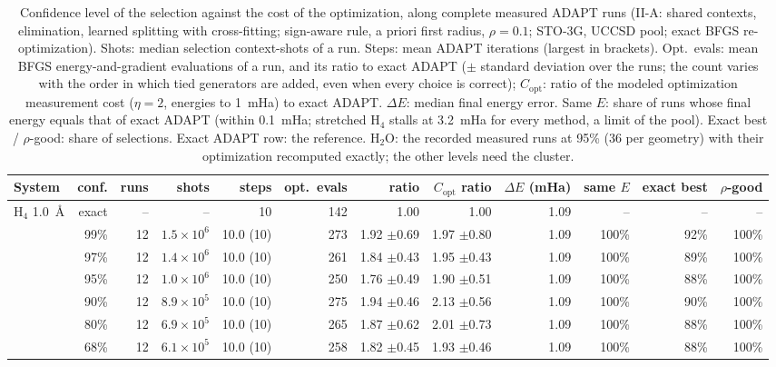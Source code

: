 \begin{table}[!htb]
\centering\small
\caption{Confidence level of the selection against the cost of the optimization, along complete measured ADAPT runs (II-A: shared contexts, elimination, learned splitting with cross-fitting; sign-aware rule, a priori first radius, $\rho=0.1$; STO-3G, UCCSD pool; exact BFGS re-optimization). Shots: median selection context-shots of a run. Steps: mean ADAPT iterations (largest in brackets). Opt.\ evals: mean BFGS energy-and-gradient evaluations of a run, and its ratio to exact ADAPT ($\pm$ standard deviation over the runs; the count varies with the order in which tied generators are added, even when every choice is correct); $C_\mathrm{opt}$: ratio of the modeled optimization measurement cost ($\eta=2$, energies to 1~mHa) to exact ADAPT. $\Delta E$: median final energy error. Same $E$: share of runs whose final energy equals that of exact ADAPT (within 0.1~mHa; stretched H$_4$ stalls at 3.2~mHa for every method, a limit of the pool). Exact best / $\rho$-good: share of selections. Exact ADAPT row: the reference. H$_2$O: the recorded measured runs at 95\% (36 per geometry) with their optimization recomputed exactly; the other levels need the cluster.}
\label{tab:ci_opt}
\footnotesize\setlength{\tabcolsep}{3.5pt}
\begin{tabular}{lrrrrrrrrrrr}
\toprule
System & conf. & runs & shots & steps & opt.\ evals & ratio & $C_\mathrm{opt}$ ratio & $\Delta E$ (mHa) & same $E$ & exact best & $\rho$-good \\
\midrule
H$_4$ 1.0~\AA & exact & -- & -- & 10 & 142 & 1.00 & 1.00 & 1.09 & -- & -- & -- \\
 & 99\% & 12 & $1.5\times10^{6}$ & 10.0 (10) & 273 & 1.92 $\pm$0.69 & 1.97 $\pm$0.80 & 1.09 & 100\% & 92\% & 100\% \\
 & 97\% & 12 & $1.4\times10^{6}$ & 10.0 (10) & 261 & 1.84 $\pm$0.43 & 1.95 $\pm$0.43 & 1.09 & 100\% & 89\% & 100\% \\
 & 95\% & 12 & $1.0\times10^{6}$ & 10.0 (10) & 250 & 1.76 $\pm$0.49 & 1.90 $\pm$0.51 & 1.09 & 100\% & 88\% & 100\% \\
 & 90\% & 12 & $8.9\times10^{5}$ & 10.0 (10) & 275 & 1.94 $\pm$0.46 & 2.13 $\pm$0.56 & 1.09 & 100\% & 90\% & 100\% \\
 & 80\% & 12 & $6.9\times10^{5}$ & 10.0 (10) & 265 & 1.87 $\pm$0.62 & 2.01 $\pm$0.73 & 1.09 & 100\% & 88\% & 100\% \\
 & 68\% & 12 & $6.1\times10^{5}$ & 10.0 (10) & 258 & 1.82 $\pm$0.45 & 1.93 $\pm$0.46 & 1.09 & 100\% & 88\% & 100\% \\

\end{tabular}
\end{table}
